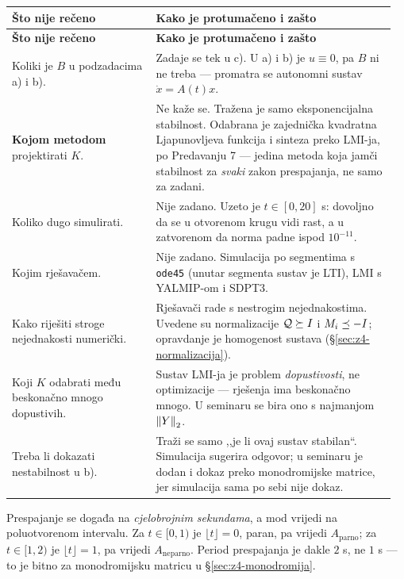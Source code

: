 \begin{longtable}{@{}p{0.36\linewidth} p{0.60\linewidth}@{}}
\toprule
\textbf{Što nije rečeno} & \textbf{Kako je protumačeno i zašto} \\
\midrule
\endfirsthead
\toprule
\textbf{Što nije rečeno} & \textbf{Kako je protumačeno i zašto} \\
\midrule
\endhead
Koliki je $B$ u podzadacima a) i b). & Zadaje se tek u c). U a) i b) je
$u \equiv 0$, pa $B$ ni ne treba --- promatra se autonomni sustav
$\dot{x} = A(t)x$. \\[6pt]
\textbf{Kojom metodom} projektirati $K$. & Ne kaže se. Tražena je samo
eksponencijalna stabilnost. Odabrana je zajednička kvadratna Ljapunovljeva
funkcija i sinteza preko LMI-ja, po Predavanju 7 --- jedina metoda koja
jamči stabilnost za \emph{svaki} zakon prespajanja, ne samo za zadani. \\[6pt]
Koliko dugo simulirati. & Nije zadano. Uzeto je $t \in [0, 20]$ s: dovoljno da
se u otvorenom krugu vidi rast, a u zatvorenom da norma padne ispod
$10^{-11}$. \\[6pt]
Kojim rješavačem. & Nije zadano. Simulacija po segmentima s \texttt{ode45}
(unutar segmenta sustav je LTI), LMI s YALMIP-om i SDPT3. \\[6pt]
Kako riješiti stroge nejednakosti numerički. & Rješavači rade s nestrogim
nejednakostima. Uvedene su normalizacije $\mathcal{Q} \succeq I$ i
$M_i \preceq -I$; opravdanje je homogenost sustava
(\S\ref{sec:z4-normalizacija}). \\[6pt]
Koji $K$ odabrati među beskonačno mnogo dopustivih. & Sustav LMI-ja je problem
\emph{dopustivosti}, ne optimizacije --- rješenja ima beskonačno mnogo. U
seminaru se bira ono s najmanjom $\left\lVert Y \right\rVert_2$. \\[6pt]
Treba li dokazati nestabilnost u b). & Traži se samo ,,je li ovaj sustav
stabilan``. Simulacija sugerira odgovor; u seminaru je dodan i dokaz preko
monodromijske matrice, jer simulacija sama po sebi nije dokaz. \\
\bottomrule
\end{longtable}

\begin{zamka}[Zamka: $\lfloor t \rfloor$ paran znači $t \in [0,1) \cup [2,3) \cup \dots$]
Prespajanje se događa na \emph{cjelobrojnim sekundama}, a mod vrijedi na
poluotvorenom intervalu. Za $t \in [0,1)$ je $\lfloor t \rfloor = 0$, paran, pa
vrijedi $A_{\mathrm{parno}}$; za $t \in [1,2)$ je $\lfloor t \rfloor = 1$, pa
vrijedi $A_{\mathrm{neparno}}$. Period prespajanja je dakle $2$ s, ne $1$ s --- to
je bitno za monodromijsku matricu u \S\ref{sec:z4-monodromija}.
\end{zamka}


